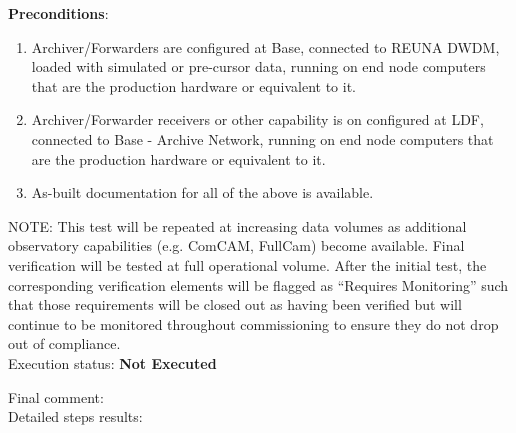 \documentclass[DM,lsstdraft,STR,toc]{lsstdoc}
\providecommand{\tightlist}{
  \setlength{\itemsep}{0pt}\setlength{\parskip}{0pt}}
\begin{document}
\textbf{ Preconditions}:\\
\begin{enumerate}
\tightlist
\item
  Archiver/Forwarders are configured at Base, connected to REUNA DWDM,
  loaded with simulated or pre-cursor data, running on end node
  computers that are the production hardware or equivalent to it.
\item
  Archiver/Forwarder receivers or other capability is on configured at
  LDF, connected to Base - Archive Network, running on end node
  computers that are the production hardware or equivalent to it.
\item
  As-built documentation for all of the above is available.
\end{enumerate}

NOTE: This test will be repeated at increasing data volumes as
additional observatory capabilities (e.g. ComCAM, FullCam) become
available. Final verification will be tested at full operational volume.
After the initial test, the corresponding verification elements will be
flagged as ``Requires Monitoring'' such that those requirements will be
closed out as having been verified but will continue to be monitored
throughout commissioning to ensure they do not drop out of
compliance.\\[2\baselineskip]

Execution status: {\bf Not Executed }

Final comment:\\


Detailed steps results:
\end{document}
